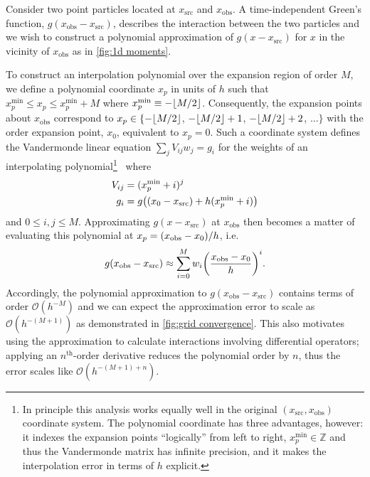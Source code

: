 Consider two point particles located at $x_\text{src}$ and $x_\text{obs}$. 
A time-independent Green's function, $g(x_\text{obs} - x_\text{src})$, describes the interaction between the two particles and we wish to construct a polynomial approximation of $g(x - x_\text{src})$ for $x$ in the vicinity of $x_\text{obs}$ as in \cref{fig:1d moments}.

To construct an interpolation polynomial over the expansion region of order $M$, we define a polynomial coordinate $x_p$ in units of $h$ such that $x_p^\text{min} \leqslant x_p \leqslant x_p^\text{min} + M$ where $x_p^\text{min} \equiv -\floor*{M/2}$.
Consequently, the expansion points about $x_\text{obs}$ correspond to $x_p \in \{-\floor*{M/2}$, $-\floor*{M/2} + 1$, $-\floor*{M/2} + 2$, $\ldots\}$ with the  order expansion point, $x_0$, equivalent to $x_p = 0$.
Such a coordinate system defines the Vandermonde linear equation $\sum_{j}V_{ij} w_j = g_i$ for the weights of an interpolating polynomial\footnote{In principle this analysis works equally well in the original $(x_\text{src}, x_\text{obs})$ coordinate system. The polynomial coordinate has three advantages, however: it indexes the expansion points ``logically'' from left to right, $x_p^\text{min} \in \mathbb{Z}$ and thus the Vandermonde matrix has infinite precision, and it makes the interpolation error in terms of $h$ explicit.}~\cite{NumericalRecipes} where
\begin{subequations}
  \begin{align}
    V_{ij} &= (x_p^\text{min} + i)^j \\
    g_i &= g\qty((x_0 - x_\text{src}) + h(x_p^\text{min} + i))
  \end{align}
\end{subequations}
and $0 \leqslant i, j \leqslant M$.
Approximating $g(x - x_\text{src})$ at $x_\text{obs}$ then becomes a matter of evaluating this polynomial at $x_p = \qty(x_\text{obs} - x_0)/h$, i.e.
\begin{equation}
  g(x_\text{obs} - x_\text{src}) \approx \sum_{i = 0}^{M} w_i \qty(\frac{x_\text{obs} - x_0}{h})^i.
\end{equation}
Accordingly, the polynomial approximation to $g(x_\text{obs} - x_\text{src})$ contains terms of order $\mathcal{O}(h^{-M})$ and we can expect the approximation error to scale as $\mathcal{O}(h^{-(M + 1)})$ as demonstrated in \cref{fig:grid convergence}.
This also motivates using the approximation to calculate interactions involving differential operators; applying an $n^\text{th}$-order derivative reduces the polynomial order by $n$, thus the error scales like $\mathcal{O}(h^{-(M + 1) + n})$.

